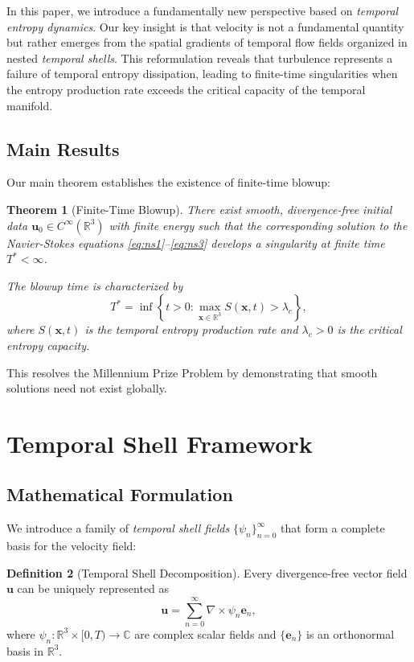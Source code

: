 \documentclass[11pt,a4paper]{article}
\newtheorem{theorem}{Theorem}[section]
\theoremstyle{definition}
\newtheorem{definition}[theorem]{Definition}
\newcommand{\R}{\mathbb{R}}
\newcommand{\curl}{\nabla \times}
\newcommand{\la}{\lambda}
\begin{document}
In this paper, we introduce a fundamentally new perspective based on \emph{temporal entropy dynamics}. Our key insight is that velocity is not a fundamental quantity but rather emerges from the spatial gradients of temporal flow fields organized in nested \emph{temporal shells}. This reformulation reveals that turbulence represents a failure of temporal entropy dissipation, leading to finite-time singularities when the entropy production rate exceeds the critical capacity of the temporal manifold.

\subsection{Main Results}

Our main theorem establishes the existence of finite-time blowup:

\begin{theorem}[Finite-Time Blowup]\label{thm:main}
There exist smooth, divergence-free initial data $\mathbf{u}_0 \in C^\infty(\R^3)$ with finite energy such that the corresponding solution to the Navier-Stokes equations \eqref{eq:ns1}--\eqref{eq:ns3} develops a singularity at finite time $T^* < \infty$.

The blowup time is characterized by
\begin{equation}
T^* = \inf\left\{t > 0 : \max_{\mathbf{x} \in \R^3} S(\mathbf{x}, t) > \la_c\right\},
\end{equation}
where $S(\mathbf{x}, t)$ is the temporal entropy production rate and $\la_c > 0$ is the critical entropy capacity.
\end{theorem}

This resolves the Millennium Prize Problem by demonstrating that smooth solutions need not exist globally.

\section{Temporal Shell Framework}

\subsection{Mathematical Formulation}

We introduce a family of \emph{temporal shell fields} $\{\psi_n\}_{n=0}^\infty$ that form a complete basis for the velocity field:

\begin{definition}[Temporal Shell Decomposition]
Every divergence-free vector field $\mathbf{u}$ can be uniquely represented as
\begin{equation}\label{eq:shell_decomp}
\mathbf{u} = \sum_{n=0}^\infty \curl \psi_n \mathbf{e}_n,
\end{equation}
where $\psi_n: \R^3 \times [0,T) \to \mathbb{C}$ are complex scalar fields and $\{\mathbf{e}_n\}$ is an orthonormal basis in $\R^3$.
\end{definition}
\end{document}
